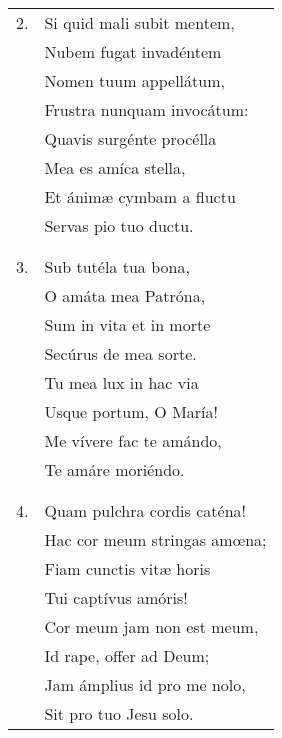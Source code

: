 \begin{longtable}{ll}
2. &Si quid mali subit mentem,\\
&Nubem fugat invadéntem\\
&Nomen tuum appellátum,\\
&Frustra nunquam invocátum:\\
&Quavis surgénte procélla\\
&Mea es amíca stella,\\
&Et ánimæ cymbam a fluctu\\
&Servas pio tuo ductu.\\
\\\\
3. &Sub tutéla tua bona,\\
&O amáta mea Patróna,\\
&Sum in vita et in morte\\
&Secúrus de mea sorte.\\
&Tu mea lux in hac via\\
&Usque portum, O María!\\
&Me vívere fac te amándo,\\
&Te amáre moriéndo.\\
\\\\
4. &Quam pulchra cordis caténa!\\
&Hac cor meum stringas amœna;\\
&Fiam cunctis vitæ horis\\
&Tui captívus amóris!\\
&Cor meum jam non est meum,\\
&Id rape, offer ad Deum;\\
&Jam ámplius id pro me nolo,\\
&Sit pro tuo Jesu solo.
\end{longtable}
